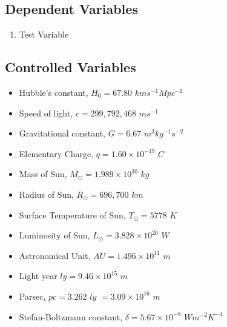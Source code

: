 \documentclass[a4paper]{IEEEtran}
\begin{document}
\subsection{Dependent Variables}

\begin{enumerate}

  \item Test Variable
  
  \end{enumerate}

\subsection{Controlled Variables}

\begin{itemize}

  \item Hubble's constant, $H_0 = 67.80$ $kms^{-1} Mpc^{-1}$ \cite{hubble}

  \item Speed of light, $c = 299,792,468$ $m s^{-1}$ \cite{speed}

  \item Gravitational constant, $G = 6.67$ $m^3 kg^{-1} s^{-2}$ \cite{tsokos}

  \item Elementary Charge, $q = 1.60 \times 10^{-19}$ $C$

  \item Mass of Sun, $M_{\odot} = 1.989 \times 10^{30}$ $kg$

  \item Radius of Sun, $R_{\odot} = 696,700$ $km$

  \item Surface Temperature of Sun, $T_{\odot} = 5778$ $K$

  \item Luminosity of Sun, $L_{\odot} = 3.828 \times 10^{26}$ $W$
    
  \item Astronomical Unit, $AU = 1.496 \times 10^{11}$ $m$

  \item Light year $ly = 9.46 \times 10^{15}$ $m$

  \item Parsec, $pc = 3.262$ $ly$ $= 3.09 \times 10^{16}$ $m$

  \item Stefan-Boltzmann constant, $\delta = 5.67 \times 10^{-8}$ $W m^{-2} K^{-4}$ \cite{sbc}


\end{itemize}
\end{document}
